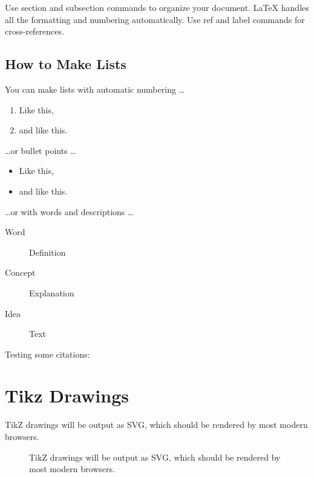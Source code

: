 \documentclass[a4paper,11pt]{article}
\begin{document}
Use section and subsection commands to organize your document. \LaTeX{} handles all the formatting and numbering automatically. Use ref and label commands for cross-references.

\subsection{How to Make Lists}

You can make lists with automatic numbering \dots

\begin{enumerate}
\item Like this,
\item and like this.
\end{enumerate}
\dots or bullet points \dots
\begin{itemize}
\item Like this,
\item and like this.
\end{itemize}
\dots or with words and descriptions \dots
\begin{description}
\item[Word] Definition
\item[Concept] Explanation
\item[Idea] Text
\end{description}

Testing some citations: \cite{NTLKProject2015,Bond2014}

\section{Tikz Drawings}

TikZ drawings will be output as SVG, which should be rendered by most modern browsers.

\begin{figure}
\centering
{}
\caption{TikZ drawings will be output as SVG, which should be rendered by most modern browsers.}
\end{figure}



\end{document}

